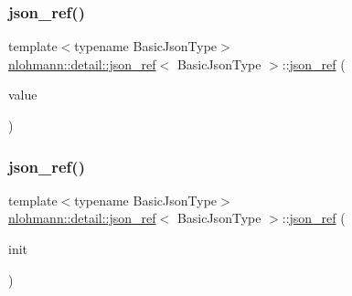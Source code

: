 \subsubsection{\texorpdfstring{json\_ref()}{json\_ref()}\hspace{0.1cm}{\footnotesize\ttfamily [2/6]}}
{\footnotesize\ttfamily template$<$typename Basic\+Json\+Type$>$ \\
\mbox{\hyperlink{classnlohmann_1_1detail_1_1json__ref}{nlohmann\+::detail\+::json\+\_\+ref}}$<$ Basic\+Json\+Type $>$\+::\mbox{\hyperlink{classnlohmann_1_1detail_1_1json__ref}{json\+\_\+ref}} (\begin{DoxyParamCaption}\item[{const \mbox{\hyperlink{classnlohmann_1_1detail_1_1json__ref_a78d76cf288141049568c0d670ed670ef}{value\+\_\+type}} \&}]{value }\end{DoxyParamCaption})\hspace{0.3cm}{\ttfamily [inline]}}

\mbox{\label{classnlohmann_1_1detail_1_1json__ref_adfba2db547283a7c6a5df9a32e72efc5}} 
\subsubsection{\texorpdfstring{json\_ref()}{json\_ref()}\hspace{0.1cm}{\footnotesize\ttfamily [3/6]}}
{\footnotesize\ttfamily template$<$typename Basic\+Json\+Type$>$ \\
\mbox{\hyperlink{classnlohmann_1_1detail_1_1json__ref}{nlohmann\+::detail\+::json\+\_\+ref}}$<$ Basic\+Json\+Type $>$\+::\mbox{\hyperlink{classnlohmann_1_1detail_1_1json__ref}{json\+\_\+ref}} (\begin{DoxyParamCaption}\item[{std\+::initializer\+\_\+list$<$ \mbox{\hyperlink{classnlohmann_1_1detail_1_1json__ref}{json\+\_\+ref}}$<$ Basic\+Json\+Type $>$ $>$}]{init }\end{DoxyParamCaption})\hspace{0.3cm}{\ttfamily [inline]}}

\mbox{\label{classnlohmann_1_1detail_1_1json__ref_a8a31d6c588d6c3c06b62008fd5d36c6c}} 
